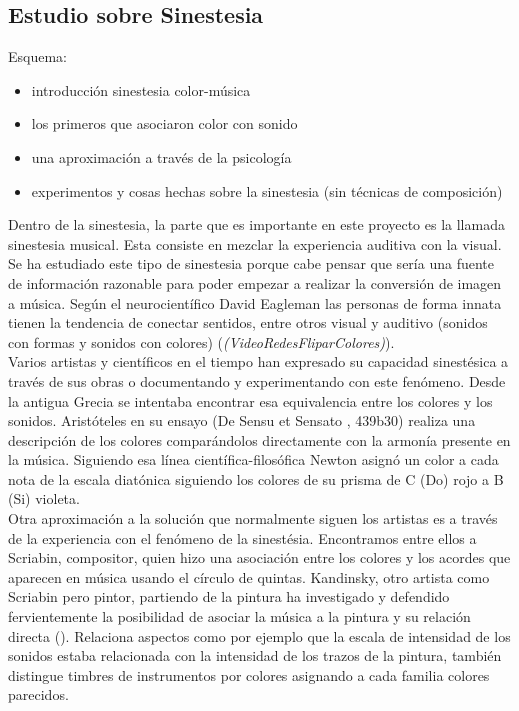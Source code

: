 \subsection{Estudio sobre Sinestesia}
\label{subsubsec:estudioSinestesia}

Esquema:
\begin{itemize}
\item introducción sinestesia color-música
\item los primeros que asociaron color con sonido
\item una aproximación a través de la psicología
\item experimentos y cosas hechas sobre la sinestesia (sin técnicas de composición)
\end{itemize}

Dentro de la sinestesia, la parte que es importante en este proyecto es la llamada sinestesia musical. Esta consiste en mezclar la experiencia auditiva con la visual. Se ha estudiado este tipo de sinestesia porque cabe pensar que sería una fuente de información razonable para poder empezar a realizar la conversión de imagen a música.
Según el neurocientífico David Eagleman las personas de forma innata tienen la tendencia de conectar sentidos, entre otros visual y auditivo (sonidos con formas y sonidos con colores) (\emph{(VideoRedesFliparColores)}).\\

Varios artistas y científicos en el tiempo han expresado su capacidad sinestésica a través de sus obras o documentando y experimentando con este fenómeno. Desde la antigua Grecia se intentaba encontrar esa equivalencia entre los colores y los sonidos. Aristóteles en su ensayo (De Sensu et Sensato \cite{DeSensuEtSensato}, 439b30) realiza una descripción de los colores comparándolos directamente con la armonía presente en la música. Siguiendo esa línea científica-filosófica Newton asignó un color a cada nota de la escala diatónica siguiendo los colores de su prisma de C (Do) rojo a B (Si) violeta.\\

Otra aproximación a la solución que normalmente siguen los artistas es a través de la experiencia con el fenómeno de la sinestésia. Encontramos entre ellos a Scriabin, compositor, quien hizo una asociación entre los colores y los acordes que aparecen en música usando el círculo de quintas. Kandinsky, otro artista como Scriabin pero pintor, partiendo de la pintura ha investigado y defendido fervientemente la posibilidad de asociar la música a la pintura y su relación directa (\cite{ConcerningSpiritualArt}). Relaciona aspectos como por ejemplo que la escala de intensidad de los sonidos estaba relacionada con la intensidad de los trazos de la pintura, también distingue timbres de instrumentos por colores asignando a cada familia colores parecidos.\\

